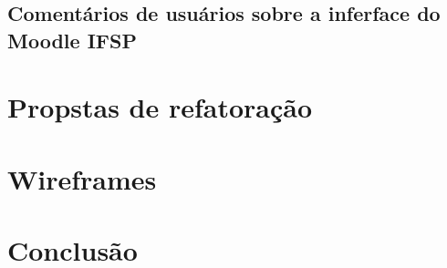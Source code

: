 \documentclass[11pt]{article}
\begin{document}
\subsection*{Comentários de usuários sobre a inferface do Moodle IFSP}
\label{sec:orgd2ab9b2}


\section*{Propstas de refatoração}
\label{sec:orgea95203}

\section*{Wireframes}
\label{sec:org7c050d5}

\section*{Conclusão}
\label{sec:org2cb91c4}
\end{document}

